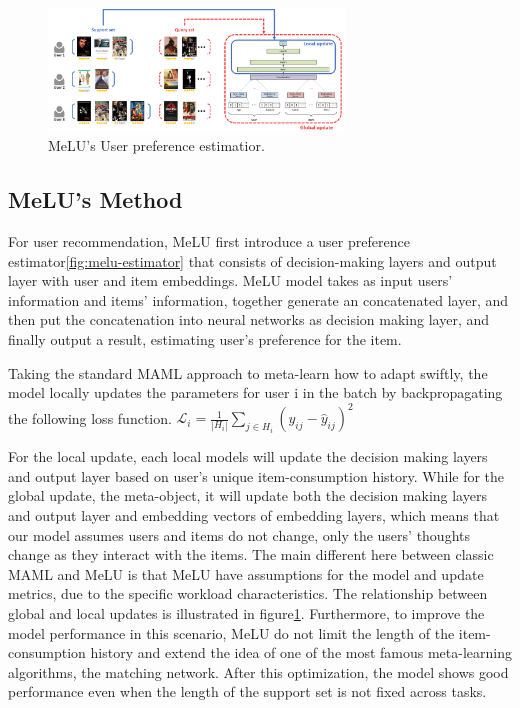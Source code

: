 \begin{figure}[H] 
    \centering 
    \includegraphics[width=0.7\textwidth]{image/MeLU-update.png} 
    \caption{MeLU's User preference estimatior.}
    \label{fig:melu-updates} 
\end{figure}


\subsection{MeLU's Method}
For user recommendation, MeLU first introduce a user preference estimator\ref{fig:melu-estimator} that consists of decision-making layers and output layer with user and item embeddings. MeLU model takes as input users' information and items' information, together generate an concatenated layer, and then put the concatenation into neural networks as decision making layer, and finally output a result, estimating user's preference for the item. 

Taking the standard MAML approach to meta-learn how to adapt swiftly, the model locally updates the parameters for user i in the batch by backpropagating the following loss function. 
$\mathcal{L}_i = \frac{1}{\left | H_i \right | } \sum_{j\in H_i} (y_{ij} - \hat{y}_{ij})^2 $

For the local update, each local models will update the decision making layers and output layer based on user's unique item-consumption history. While for the global update, the meta-object, it will update both the decision making layers and output layer and embedding vectors of embedding layers, which means that our model assumes users and items do not change, only the users’ thoughts change as they interact with the items. The main different here between classic MAML and MeLU is that MeLU have assumptions for the model and update metrics, due to the specific workload characteristics. The relationship between global and local updates is illustrated in figure\ref{fig:melu-updates}. Furthermore, to improve the model performance in this scenario, MeLU do not limit the length of the item-consumption history and extend the idea of one of the most famous meta-learning algorithms, the matching network. After this optimization, the model shows good performance even when the length of the support set is not fixed across tasks.

